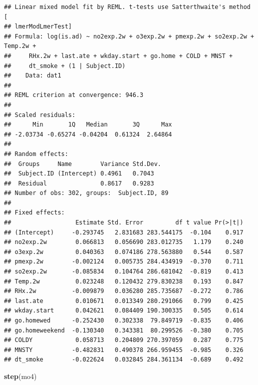 \documentclass[12pt,]{article}
\newenvironment{Shaded}{\begin{snugshade}}{\end{snugshade}}
\newcommand{\KeywordTok}[1]{\textcolor[rgb]{0.13,0.29,0.53}{\textbf{#1}}}
\newcommand{\NormalTok}[1]{#1}
\begin{document}
\begin{verbatim}
## Linear mixed model fit by REML. t-tests use Satterthwaite's method [
## lmerModLmerTest]
## Formula: log(is.ad) ~ no2exp.2w + o3exp.2w + pmexp.2w + so2exp.2w + Temp.2w +  
##     RHx.2w + last.ate + wkday.start + go.home + COLD + MNST +  
##     dt_smoke + (1 | Subject.ID)
##    Data: dat1
## 
## REML criterion at convergence: 946.3
## 
## Scaled residuals: 
##      Min       1Q   Median       3Q      Max 
## -2.03734 -0.65274 -0.04204  0.61324  2.64864 
## 
## Random effects:
##  Groups     Name        Variance Std.Dev.
##  Subject.ID (Intercept) 0.4961   0.7043  
##  Residual               0.8617   0.9283  
## Number of obs: 302, groups:  Subject.ID, 89
## 
## Fixed effects:
##                  Estimate Std. Error         df t value Pr(>|t|)
## (Intercept)     -0.293745   2.831683 283.544175  -0.104    0.917
## no2exp.2w        0.066813   0.056690 283.012735   1.179    0.240
## o3exp.2w         0.040363   0.074186 278.563880   0.544    0.587
## pmexp.2w        -0.002124   0.005735 284.434919  -0.370    0.711
## so2exp.2w       -0.085834   0.104764 286.681042  -0.819    0.413
## Temp.2w          0.023248   0.120432 279.830238   0.193    0.847
## RHx.2w          -0.009879   0.036280 285.735687  -0.272    0.786
## last.ate         0.010671   0.013349 280.291066   0.799    0.425
## wkday.start      0.042621   0.084409 190.300335   0.505    0.614
## go.homewed      -0.252430   0.302338  79.849719  -0.835    0.406
## go.homeweekend  -0.130340   0.343381  80.299526  -0.380    0.705
## COLDY            0.058713   0.204809 270.397059   0.287    0.775
## MNSTY           -0.482831   0.490378 266.959455  -0.985    0.326
## dt_smoke        -0.022624   0.032845 284.361134  -0.689    0.492
\end{verbatim}

\begin{Shaded}
\begin{Highlighting}[]
\KeywordTok{step}\NormalTok{(mo4)}
\end{Highlighting}
\end{Shaded}
\end{document}
